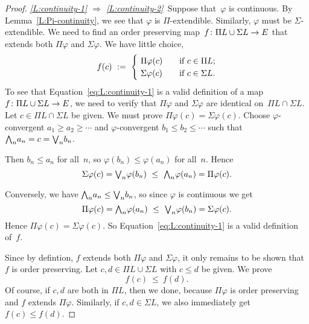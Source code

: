 \documentclass[main.tex]{subfiles}
\begin{document}
\begin{proof}
\noindent
\emph{\ref{L:continuity-1}
$\Longrightarrow$
\ref{L:continuity-2}}\ 
Suppose that~$\varphi$ is continuous.
By Lemma~\ref{L:Pi-continuity},
we see that $\varphi$ is $\Pi$-extendible.
Similarly, $\varphi$ must be $\Sigma$-extendible.
We need to find an order preserving map~$f\colon \Pi L \cup \Sigma L \rightarrow E$
that extends both $\Pi\varphi$ and $\Sigma\varphi$.
We have little choice,
\begin{equation}
\label{eq:L:continuity-1}
f(c) \ \eqdf \ 
\begin{cases}
\ \Pi\varphi(c) \quad& \text{if }c\in \Pi L;\\
\ \Sigma\varphi(c) \quad& \text{if }c\in \Sigma L.
\end{cases}
\end{equation}
To see that Equation~\eqref{eq:L:continuity-1}
is a valid definition of a 
map $f\colon \Pi L \cup \Sigma L \rightarrow E$,
we need to verify that $\Pi\varphi$ and $\Sigma\varphi$
are identical on~$\Pi L \cap \Sigma L$.
Let $c\in \Pi L \cap \Sigma L$
be given.
We must prove $\Pi\varphi(c) = \Sigma\varphi(c)$.
Choose $\varphi$-convergent
$a_1 \geq a_2 \geq \dotsb$ and
$\varphi$-convergent
$b_1 \leq b_2 \leq \dotsb$
such that $\textstyle{\bigwedge}_n a_n =c= \textstyle{\bigvee}_n b_n$.

Then $b_n \leq a_n$ for all~$n$, so
$\varphi(b_n)\leq \varphi(a_n)$ for all~$n$.
Hence
\begin{equation*}
\Sigma\varphi(c)
=\textstyle{\bigvee}_n \varphi(b_n)
\ \leq\ \textstyle{\bigwedge}_n \varphi(a_n)
=\Pi\varphi(c).
\end{equation*}

Conversely,
we have $\textstyle{\bigwedge}_n a_n \leq \textstyle{\bigvee}_n b_n$,
so since $\varphi$ is continuous we get
\begin{equation*}
\Pi\varphi(c)
=\textstyle{\bigwedge}_n \varphi(a_n)
\ \leq\ \textstyle{\bigvee}_n \varphi(b_n)
=\Sigma\varphi(c).
\end{equation*}
Hence $\Pi\varphi(c)=\Sigma\varphi(c)$.
So Equation~\eqref{eq:L:continuity-1}
is a valid definition of~$f$.

Since by defintion,
$f$ extends both $\Pi\varphi$ and $\Sigma\varphi$,
it only remains to be shown that~$f$ is order preserving.
Let $c,d\in \Pi L \cup \Sigma L$
with $c\leq d$ be given.
We prove
\begin{equation*}
f(c)\ \leq\  f(d).
\end{equation*}
Of course,
if $c,d$ are both in $\Pi L$,
then we done,
because $\Pi \varphi$
is order preserving 
and $f$ extends $\Pi\varphi$.
Similarly, if $c,d\in\Sigma L$, 
we also immediately get $f(c)\leq f(d)$.


\end{proof}
\end{document}
